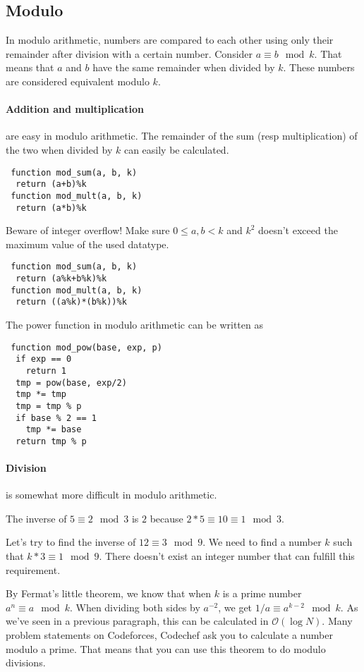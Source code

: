 \subsection{Modulo}
In modulo arithmetic, numbers are compared to each other using only their remainder after division with a certain number.
Consider $a \equiv b \mod{k}$. That means that $a$ and $b$ have the same remainder when divided by $k$. These numbers are considered equivalent modulo $k$.

\paragraph{Addition and multiplication} are easy in modulo arithmetic. The remainder of the sum (resp multiplication) of the two when divided by $k$ can easily be calculated.

\begin{lstlisting}
 function mod_sum(a, b, k)
  return (a+b)%k
 function mod_mult(a, b, k)
  return (a*b)%k
\end{lstlisting}

Beware of integer overflow! Make sure $0 \leq a, b < k$ and $k^2$ doesn't exceed the maximum value of the used datatype.

\begin{lstlisting}
 function mod_sum(a, b, k)
  return (a%k+b%k)%k
 function mod_mult(a, b, k)
  return ((a%k)*(b%k))%k
\end{lstlisting}

The power function in modulo arithmetic can be written as
\begin{lstlisting}
 function mod_pow(base, exp, p)
  if exp == 0
    return 1
  tmp = pow(base, exp/2)
  tmp *= tmp
  tmp = tmp % p
  if base % 2 == 1
    tmp *= base
  return tmp % p
\end{lstlisting}




\paragraph{Division} is somewhat more difficult in modulo arithmetic. 

The inverse of $5 \equiv 2 \mod{3}$ is $2$ because $2*5 \equiv 10 \equiv 1 \mod{3}$.

Let's try to find the inverse of $12 \equiv 3 \mod{9}$. 
We need to find a number $k$ such that $k*3 \equiv 1 \mod{9}$. There doesn't exist an integer number that can fulfill this requirement.

By Fermat's little theorem, we know that when $k$ is a prime number $a^n \equiv a \mod{k}$. When dividing both sides by $a^{-2}$, we get $1/a \equiv a^{k-2} \mod{k}$. As we've seen in a previous paragraph, this can be calculated in $ \mathcal{O}{\left(\log{N}\right)} $.
Many problem statements on Codeforces, Codechef ask you to calculate a number modulo a prime. That means that you can use this theorem to do modulo divisions.